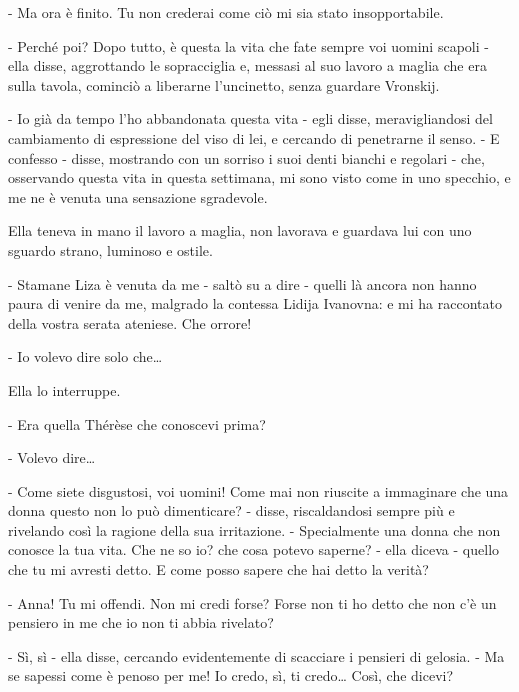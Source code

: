 - Ma ora è finito. Tu non crederai come ciò mi sia stato insopportabile. 

- Perché poi? Dopo tutto, è questa la vita che fate sempre voi uomini scapoli - ella disse, aggrottando le sopracciglia e, messasi al suo lavoro a maglia che era sulla tavola, cominciò a liberarne l'uncinetto, senza guardare Vronskij. 

- Io già da tempo l'ho abbandonata questa vita - egli disse, meravigliandosi del cambiamento di espressione del viso di lei, e cercando di penetrarne il senso. - E confesso - disse, mostrando con un sorriso i suoi denti bianchi e regolari - che, osservando questa vita in questa settimana, mi sono visto come in uno specchio, e me ne è venuta una sensazione sgradevole. 

Ella teneva in mano il lavoro a maglia, non lavorava e guardava lui con uno sguardo strano, luminoso e ostile. 

- Stamane Liza è venuta da me - saltò su a dire - quelli là ancora non hanno paura di venire da me, malgrado la contessa Lidija Ivanovna: e mi ha raccontato della vostra serata ateniese. Che orrore! 

- Io volevo dire solo che\ldots{} 

Ella lo interruppe. 

- Era quella Thérèse che conoscevi prima? 

- Volevo dire\ldots{} 

- Come siete disgustosi, voi uomini! Come mai non riuscite a immaginare che una donna questo non lo può dimenticare? - disse, riscaldandosi sempre più e rivelando così la ragione della sua irritazione. - Specialmente una donna che non conosce la tua vita. Che ne so io? che cosa potevo saperne? - ella diceva - quello che tu mi avresti detto. E come posso sapere che hai detto la verità? 

- Anna! Tu mi offendi. Non mi credi forse? Forse non ti ho detto che non c'è un pensiero in me che io non ti abbia rivelato? 

- Sì, sì - ella disse, cercando evidentemente di scacciare i pensieri di gelosia. - Ma se sapessi come è penoso per me! Io credo, sì, ti credo\ldots{} Così, che dicevi? 

